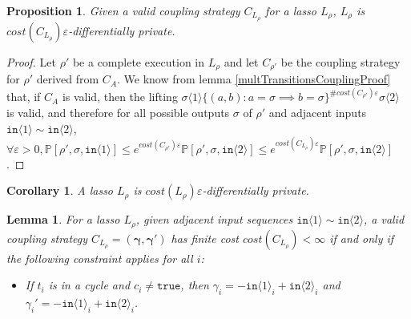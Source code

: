 \documentclass[12pt]{article}
\newcommand{\PP}{\mathbb{P}}
\newcommand{\brangle}[1]{\langle #1 \rangle}
\newtheorem{lemma}[thm]{Lemma}
\newtheorem{prop}[thm]{Proposition}
\newtheorem{cor}[thm]{Corollary}
\theoremstyle{definition}
\begin{document}
\begin{prop}
    Given a valid coupling strategy $C_{L_\rho}$ for a lasso $L_\rho$, $L_\rho$ is $cost(C_{L_\rho})\varepsilon$-differentially private. 
\end{prop}
\begin{proof}
    Let $\rho'$ be a complete execution in $L_\rho$ and let $C_{\rho'}$ be the coupling strategy for $\rho'$ derived from $C_A$. We know from lemma \ref{multTransitionsCouplingProof} that, if $C_A$ is valid, then the lifting $\sigma\brangle{1}\{(a, b): a=\sigma\implies b=\sigma\}^{\#cost(C_{\rho'})\varepsilon}\sigma\brangle{2}$ is valid, 
    and therefore for all possible outputs $\sigma$ of $\rho'$ and adjacent inputs $\texttt{in}\brangle{1}\sim\texttt{in}\brangle{2}$, $\forall \varepsilon>0, \PP[\rho', \sigma, \texttt{in}\brangle{1}]\leq e^{cost(C_{\rho'})\varepsilon}\PP[\rho', \sigma, \texttt{in}\brangle{2}]\leq e^{cost(C_{L_\rho})\varepsilon}\PP[\rho', \sigma, \texttt{in}\brangle{2}]$.
\end{proof}
\begin{cor}
    A lasso $L_\rho$ is $cost(L_\rho)\varepsilon$-differentially private. 
\end{cor}



\begin{lemma}\label{finiteCostConstraintLemma}
    For a lasso $L_\rho$, given adjacent input sequences $\texttt{in}\brangle{1}\sim \texttt{in}\brangle{2}$, a valid coupling strategy $C_{L_\rho} = (\mathbf{\gamma}, \mathbf{\gamma}')$ has finite cost $cost(C_{L_\rho})<\infty$ if and only if the following constraint applies for all $i$:
    \begin{itemize}
        \item If $t_i$ is in a cycle and $c_i\neq\texttt{true}$, then $\gamma_i = -\texttt{in}\brangle{1}_i+\texttt{in}\brangle{2}_i$ and $\gamma_i' = -\texttt{in}\brangle{1}_i+\texttt{in}\brangle{2}_i$.
    \end{itemize}
\end{lemma}
\end{document}
